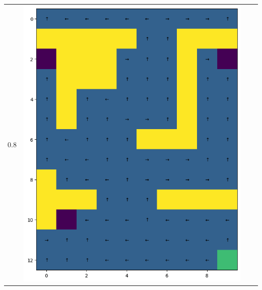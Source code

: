 \documentclass[12pt,a4paper]{report}
\begin{document}
\begin{landscape}
\begin{center}
\begin{tabular}{c || c  c  c}
        \\
        0.8 &
            \includegraphics[width=0.35\textheight]{assets/dp/analysis/prob_0.1_gamma_0.8_policy.png}
        & 

\end{tabular}
\end{center}
\end{landscape}
\end{document}
